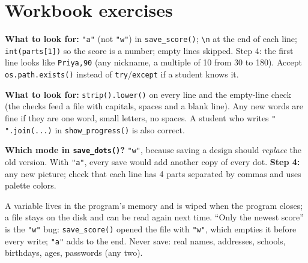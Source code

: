 
\section{Workbook exercises}
\begin{answer}
\textbf{What to look for:} \texttt{"a"} (not \texttt{"w"}) in \texttt{save\_score()}; \texttt{\textbackslash n} at the end of each line;
\texttt{int(parts[1])} so the score is a number; empty lines skipped. Step 4: the first line looks like \texttt{Priya,90} (any nickname,
a multiple of 10 from 30 to 180). Accept \texttt{os.path.exists()} instead of \texttt{try}/\texttt{except} if a student knows it.
\end{answer}

\begin{answer}
\textbf{What to look for:} \texttt{strip().lower()} on every line and the empty-line check (the checks feed a file with capitals, spaces and a blank line).
Any new words are fine if they are one word, small letters, no spaces. A student who writes \texttt{" ".join(...)} in \texttt{show\_progress()} is also correct.
\end{answer}

\begin{answer}
\textbf{Which mode in \texttt{save\_dots()}?} \texttt{"w"}, because saving a design should \emph{replace} the old version. With \texttt{"a"},
every save would add another copy of every dot. \textbf{Step 4:} any new picture; check that each line has 4 parts separated by commas and uses palette colors.
\end{answer}

\begin{answer}[Reflection]
A variable lives in the program's memory and is wiped when the program closes; a file stays on the disk and can be read
again next time. \enquote{Only the newest score} is the \texttt{"w"} bug: \texttt{save\_score()} opened the file with
\texttt{"w"}, which empties it before every write; \texttt{"a"} adds to the end. Never save: real names, addresses,
schools, birthdays, ages, passwords (any two).
\end{answer}

